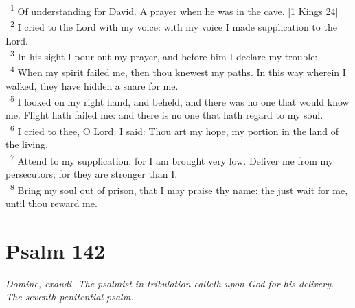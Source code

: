 \documentclass[a5paper,12pt]{article}
\begin{document}
\begin{multicols*}{2}
~\textsuperscript{1} Of understanding for David. A prayer when he was in the cave. [1 Kings 24]\\
~\textsuperscript{2} I cried to the Lord with my voice: with my voice I made supplication to the Lord.\\
~\textsuperscript{3} In his sight I pour out my prayer, and before him I declare my trouble:\\
~\textsuperscript{4} When my spirit failed me, then thou knewest my paths. In this way wherein I walked, they have hidden a snare for me.\\
~\textsuperscript{5} I looked on my right hand, and beheld, and there was no one that would know me. Flight hath failed me: and there is no one that hath regard to my soul.\\
~\textsuperscript{6} I cried to thee, O Lord: I said: Thou art my hope, my portion in the land of the living.\\
~\textsuperscript{7} Attend to my supplication: for I am brought very low. Deliver me from my persecutors; for they are stronger than I.\\
~\textsuperscript{8} Bring my soul out of prison, that I may praise thy name: the just wait for me, until thou reward me.\\

\section{Psalm 142}
\label{sec:orgede77cd}
\emph{Domine, exaudi. The psalmist in tribulation calleth upon God for his delivery. The seventh penitential psalm.}\\


\end{multicols*}
\end{document}

